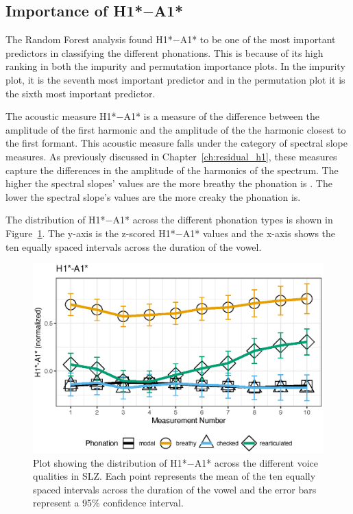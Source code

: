 \subsection{Importance of \texorpdfstring{H1*$-$A1*}{H1*-A1*}} \label{sec:h1a1_discussion}

The Random Forest analysis found H1*$-$A1* to be one of the most important predictors in classifying the different phonations. This is because of its high ranking in both the impurity and permutation importance plots. In the impurity plot, it is the seventh most important predictor and in the permutation plot it is the sixth most important predictor.

The acoustic measure H1*$-$A1* is a measure of the difference between the amplitude of the first harmonic and the amplitude of the the harmonic closest to the first formant. This acoustic measure falls under the category of spectral slope measures. As previously discussed in Chapter~\ref{ch:residual_h1}, these measures capture the differences in the amplitude of the harmonics of the spectrum. The higher the spectral slopes' values are the more breathy the phonation is \citep{fischer-jorgensenPhoneticAnalysisBreathy1968}. The lower the spectral slope's values are the more creaky the phonation is.

The distribution of H1*$-$A1* across the different phonation types is shown in Figure~\ref{fig:h1a1}. The y-axis is the z-scored H1*$-$A1* values and the x-axis shows the ten equally spaced intervals across the duration of the vowel. 

\begin{figure}[h!]
    \centering
    \includegraphics[width = 0.9\linewidth]{images/h1a1_line.eps}
    \caption{Plot showing the distribution of H1*$-$A1* across the different voice qualities in SLZ. Each point represents the mean of the ten equally spaced intervals across the duration of the vowel and the error bars represent a 95\% confidence interval.}
    \label{fig:h1a1}
\end{figure}

